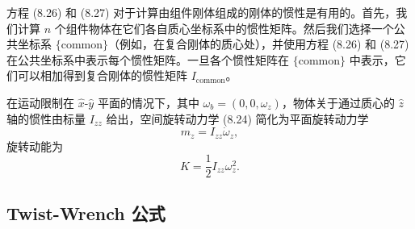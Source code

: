 \documentclass[12pt,a4paper]{article}
\begin{document}
方程 (8.26) 和 (8.27) 对于计算由组件刚体组成的刚体的惯性是有用的。首先，我们计算 $n$ 个组件物体在它们各自质心坐标系中的惯性矩阵。然后我们选择一个公共坐标系 $\{\text{common}\}$（例如，在复合刚体的质心处），并使用方程 (8.26) 和 (8.27) 在公共坐标系中表示每个惯性矩阵。一旦各个惯性矩阵在 $\{\text{common}\}$ 中表示，它们可以相加得到复合刚体的惯性矩阵 $I_{\text{common}}$。

在运动限制在 $\hat{x}$-$\hat{y}$ 平面的情况下，其中 $\omega_b = (0, 0, \omega_z)$，物体关于通过质心的 $\hat{z}$ 轴的惯性由标量 $I_{zz}$ 给出，空间旋转动力学 (8.24) 简化为平面旋转动力学
\begin{equation}
m_z = I_{zz}\dot{\omega}_z,
\end{equation}
旋转动能为
\begin{equation}
K = \frac{1}{2}I_{zz}\omega_z^2.
\end{equation}

\subsection{Twist-Wrench 公式}
\end{document}
